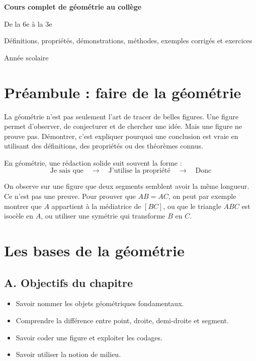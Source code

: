 \documentclass[11pt,a4paper]{article}
\newcounter{exercice}
\newcommand{\chapitre}[1]{
\clearpage
\section{#1}
}
\newcommand{\objectif}[1]{\subsection*{A. Objectifs du chapitre}#1}
\begin{document}
\begin{titlepage}
\centering
\vspace*{2cm}
{\Huge\bfseries Cours complet de géométrie au collège\par}
\vspace{0.4cm}
{\Large De la 6e à la 3e\par}
\vspace{1cm}
{\large Définitions, propriétés, démonstrations, méthodes, exemples corrigés et exercices\par}
\vfill

\vfill
{\large Année scolaire \the\year}
\end{titlepage}

\tableofcontents
\clearpage

\section*{Préambule : faire de la géométrie}

La géométrie n'est pas seulement l'art de tracer de belles figures. Une figure permet d'observer, de conjecturer et de chercher une idée. Mais une figure ne prouve pas. Démontrer, c'est expliquer pourquoi une conclusion est vraie en utilisant des définitions, des propriétés ou des théorèmes connus.

\begin{retenirbox}
En géométrie, une rédaction solide suit souvent la forme :
\[
\text{Je sais que} \quad \longrightarrow \quad \text{J'utilise la propriété} \quad \longrightarrow \quad \text{Donc}
\]
\end{retenirbox}

\begin{exemplebox}
On observe sur une figure que deux segments semblent avoir la même longueur. Ce n'est pas une preuve. Pour prouver que $AB=AC$, on peut par exemple montrer que $A$ appartient à la médiatrice de $[BC]$, ou que le triangle $ABC$ est isocèle en $A$, ou utiliser une symétrie qui transforme $B$ en $C$.
\end{exemplebox}

\chapitre{Les bases de la géométrie}

\objectif{
\begin{itemize}
\item Savoir nommer les objets géométriques fondamentaux.
\item Comprendre la différence entre point, droite, demi-droite et segment.
\item Savoir coder une figure et exploiter les codages.
\item Savoir utiliser la notion de milieu.
\end{itemize}}
\end{document}
